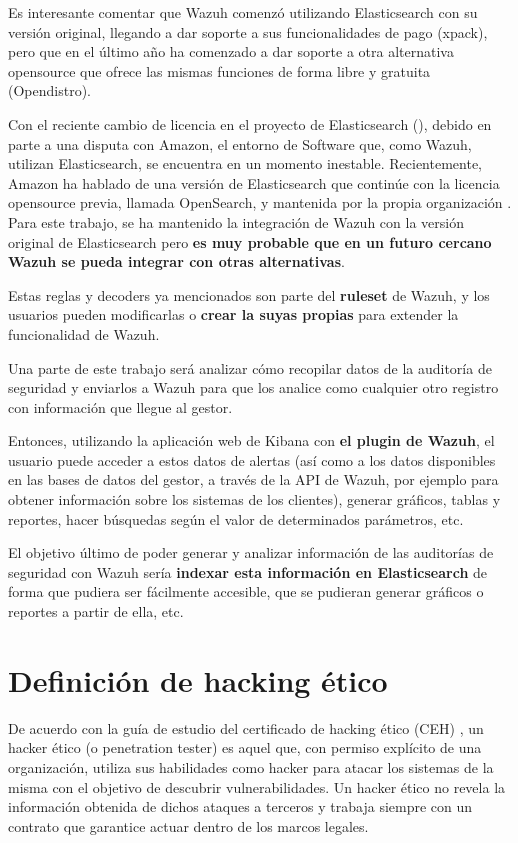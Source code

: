 Es interesante comentar que Wazuh comenzó utilizando Elasticsearch con su versión original, llegando a dar soporte a sus funcionalidades de pago (xpack), pero que en el último año ha comenzado a dar soporte a otra alternativa opensource que ofrece las mismas funciones de forma libre y gratuita (Opendistro).

Con el reciente cambio de licencia en el proyecto de Elasticsearch (\cite{licensechange}), debido en parte a una disputa con Amazon, el entorno de Software que, como Wazuh, utilizan Elasticsearch, se encuentra en un momento inestable. Recientemente, Amazon ha hablado de una versión de Elasticsearch que continúe con la licencia opensource previa, llamada OpenSearch, y mantenida por la propia organización \cite{OpenSearch}. Para este trabajo, se ha mantenido la integración de Wazuh con la versión original de Elasticsearch pero \textbf{es muy probable que en un futuro cercano Wazuh se pueda integrar con otras alternativas}.

Estas reglas y decoders ya mencionados son parte del \textbf{ruleset} de Wazuh, y los usuarios pueden modificarlas o \textbf{crear la suyas propias} para extender la funcionalidad de Wazuh.

Una parte de este trabajo será analizar cómo recopilar datos de la auditoría de seguridad y enviarlos a Wazuh para que los analice como cualquier otro registro con información que llegue al gestor.

Entonces, utilizando la aplicación web de Kibana con \textbf{el plugin de Wazuh}, el usuario puede acceder a estos datos de alertas (así como a los datos disponibles en las bases de datos del gestor, a través de la API de Wazuh, por ejemplo para obtener información sobre los sistemas de los clientes), generar gráficos, tablas y reportes, hacer búsquedas según el valor de determinados parámetros, etc.

El objetivo último de poder generar y analizar información de las auditorías de seguridad con Wazuh sería \textbf{indexar esta información en Elasticsearch} de forma que pudiera ser fácilmente accesible, que se pudieran generar gráficos o reportes a partir de ella, etc.


\section{Definición de hacking ético}

De acuerdo con la guía de estudio del certificado de hacking ético (CEH) \cite{ceh}, un hacker ético (o penetration tester) es aquel que, con permiso explícito de una organización, utiliza sus habilidades como hacker para atacar los sistemas de la misma con el objetivo de descubrir vulnerabilidades. Un hacker ético no revela la información obtenida de dichos ataques a terceros y trabaja siempre con un contrato que garantice actuar dentro de los marcos legales.

